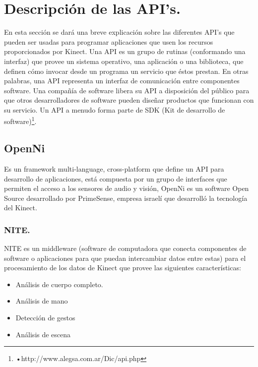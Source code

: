 \documentclass[11pt,a4paper]{article}
\begin{document}
\section{Descripción de las API's.}
En esta sección se dará una breve explicación sobre las diferentes API's que pueden ser usadas para programar aplicaciones que usen los recursos proporcionados por Kinect. \newline
Una API es un grupo de rutinas (conformando una interfaz) que provee un sistema operativo, una aplicación o una biblioteca, que definen cómo invocar desde  un programa un servicio que éstos prestan. En otras palabras, una API representa un interfaz de comunicación entre componentes software. Una compañía de software libera su API a disposición del público para que otros desarrolladores de software pueden diseñar productos que funcionan con su servicio. Un API a menudo forma parte de SDK (Kit de desarrollo de software)\footnote{•http://www.alegsa.com.ar/Dic/api.php}.%

\subsection{OpenNi}
Es un framework multi-language, cross-platform que define un API para desarrollo de aplicaciones, está compuesta por un grupo de interfaces que permiten el acceso a los sensores de audio y visión, OpenNi es un software Open Source desarrollado por PrimeSense, empresa israelí que desarrolló la tecnología del Kinect.

\subsubsection{NITE.}
NITE es un middleware (software de computadora  que conecta componentes de software o aplicaciones para que puedan intercambiar datos entre estas) para el procesamiento de los datos de Kinect que provee las siguientes características:
\begin{itemize}
\item Análisis de cuerpo completo.
\item Análisis de mano
\item Detección de gestos 
\item Análisis de escena 
\end{itemize} 
\end{document}
